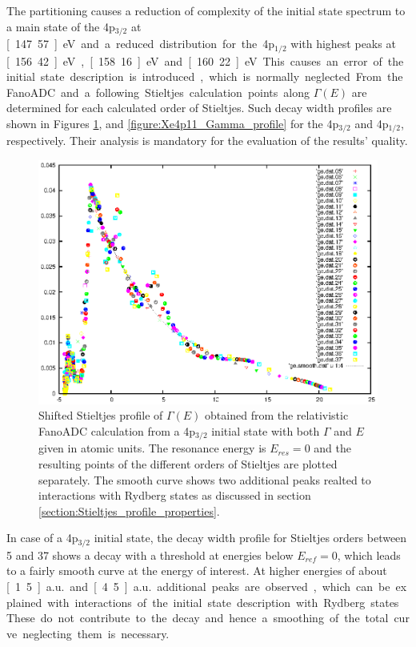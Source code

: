 The partitioning causes a reduction of complexity of the initial state
spectrum to a main state of the 4p$_{3/2}$ at \unit[147.57]{eV} and a
reduced distribution for
the 4p$_{1/2}$ with highest peaks at \unit[156.42]{eV}, \unit[158.16]{eV}
and \unit[160.22]{eV}.
This causes an error of the initial state description is introduced,
which is normally neglected.

From the FanoADC and a following Stieltjes calculation points along $\Gamma(E)$ are
determined for each calculated order of Stieltjes. Such decay width profiles
are shown in Figures \ref{figure:Xe4p33_Gamma_profile},
and \ref{figure:Xe4p11_Gamma_profile}
for the 4p$_{3/2}$ and 4p$_{1/2}$, respectively.
Their analysis is mandatory for the evaluation of the results' quality.

\begin{figure}[htb]
  \centering
  \includegraphics[scale=1.15]{pics/Xe4p_33_gammae.eps}
  \caption{Shifted Stieltjes profile of $\Gamma(E)$ obtained from the
           relativistic FanoADC calculation from
           a 4p$_{3/2}$
           initial state with both $\Gamma$ and $E$ given in atomic units.
           The resonance energy is $E_{res}=0$ and the resulting points
           of the different orders of Stieltjes are plotted separately.
           The smooth curve shows two
           additional peaks realted to interactions with Rydberg states as
           discussed in section \ref{section:Stieltjes_profile_properties}.
           }
  \label{figure:Xe4p33_Gamma_profile}
\end{figure}

In case of a 4p$_{3/2}$ initial state, the decay width profile for Stieltjes
orders between 5 and 37 shows a decay
with a threshold at energies below $E_{ref}=0$, which leads to a fairly smooth
curve at the energy of interest.
At higher energies of about \unit[1.5]{a.u.} and
\unit[4.5]{a.u.} additional peaks are observed, which can be explained with
interactions of the initial state description with Rydberg states. These do not
contribute to the decay and hence a smoothing of the total curve neglecting them
is necessary.


